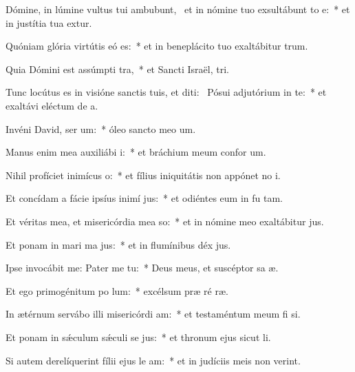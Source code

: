 \item Dómine, in lúmine vultus tui ambubunt,~\pscross{} et in nómine tuo exsultábunt to e:~* et in justítia tua extur.
\item Quóniam glória virtútis eó  es:~* et in beneplácito tuo exaltábitur  trum.
\item Quia Dómini est assúmpti tra,~* et Sancti Israël,  tri.
\item Tunc locútus es in visióne sanctis tuis, et diti:~\pscross{} Pósui adjutórium in te:~* et exaltávi eléctum de  a.
\item Invéni David, ser um:~* óleo sancto meo  um.
\item Manus enim mea auxiliábi i:~* et bráchium meum confor um.
\item Nihil profíciet inimícus  o:~* et fílius iniquitátis non appónet no i.
\item Et concídam a fácie ipsíus inimí jus:~* et odiéntes eum in fu tam.
\item Et véritas mea, et misericórdia mea  so:~* et in nómine meo exaltábitur  jus.
\item Et ponam in mari ma jus:~* et in flumínibus déx jus.
\item Ipse invocábit me: Pater me  tu:~* Deus meus, et suscéptor sa æ.
\item Et ego primogénitum po lum:~* excélsum præ ré ræ.
\item In ætérnum servábo illi misericórdi am:~* et testaméntum meum fi si.
\item Et ponam in sǽculum sǽculi se jus:~* et thronum ejus sicut  li.
\item Si autem derelíquerint fílii ejus le am:~* et in judíciis meis non verint.
